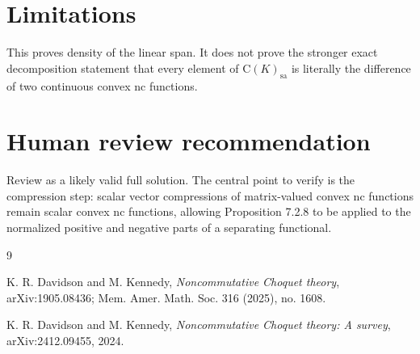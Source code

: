 \documentclass[11pt]{article}
\newcommand{\CK}{\mathrm{C}(K)}
\newcommand{\sa}{\mathrm{sa}}
\begin{document}
\section{Limitations}

This proves density of the linear span.  It does not prove the stronger exact
decomposition statement that every element of \(\CK_{\sa}\) is literally the
difference of two continuous convex nc functions.

\section{Human review recommendation}

Review as a likely valid full solution.  The central point to verify is the
compression step: scalar vector compressions of matrix-valued convex nc
functions remain scalar convex nc functions, allowing Proposition 7.2.8 to be
applied to the normalized positive and negative parts of a separating
functional.

\begin{thebibliography}{9}

K. R. Davidson and M. Kennedy,
\emph{Noncommutative Choquet theory},
arXiv:1905.08436; Mem. Amer. Math. Soc. 316 (2025), no. 1608.

K. R. Davidson and M. Kennedy,
\emph{Noncommutative Choquet theory: A survey},
arXiv:2412.09455, 2024.

\end{thebibliography}
\end{document}
